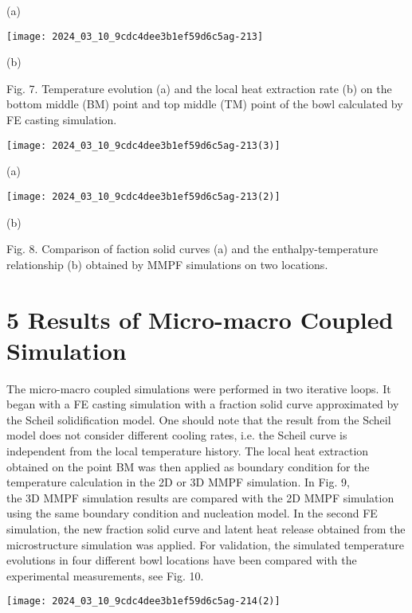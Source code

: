 \documentclass[10pt]{article}
\begin{document}
(a)

\begin{center}
\texttt{[image: 2024\_03\_10\_9cdc4dee3b1ef59d6c5ag-213]}
\end{center}

(b)

Fig. 7. Temperature evolution (a) and the local heat extraction rate (b) on the bottom middle (BM) point and top middle (TM) point of the bowl calculated by FE casting simulation.

\begin{center}
\texttt{[image: 2024\_03\_10\_9cdc4dee3b1ef59d6c5ag-213(3)]}
\end{center}

(a)

\begin{center}
\texttt{[image: 2024\_03\_10\_9cdc4dee3b1ef59d6c5ag-213(2)]}
\end{center}

(b)

Fig. 8. Comparison of faction solid curves (a) and the enthalpy-temperature relationship (b) obtained by MMPF simulations on two locations.

\section*{5 Results of Micro-macro Coupled Simulation}
The micro-macro coupled simulations were performed in two iterative loops. It began with a FE casting simulation with a fraction solid curve approximated by the Scheil solidification model. One should note that the result from the Scheil model does not consider different cooling rates, i.e. the Scheil curve is independent from the local temperature history. The local heat extraction obtained on the point BM was then applied as boundary condition for the temperature calculation in the 2D or 3D MMPF simulation. In Fig. 9,\\
the 3D MMPF simulation results are compared with the 2D MMPF simulation using the same boundary condition and nucleation model. In the second FE simulation, the new fraction solid curve and latent heat release obtained from the microstructure simulation was applied. For validation, the simulated temperature evolutions in four different bowl locations have been compared with the experimental measurements, see Fig. 10.

\begin{center}
\texttt{[image: 2024\_03\_10\_9cdc4dee3b1ef59d6c5ag-214(2)]}
\end{center}
\end{document}
